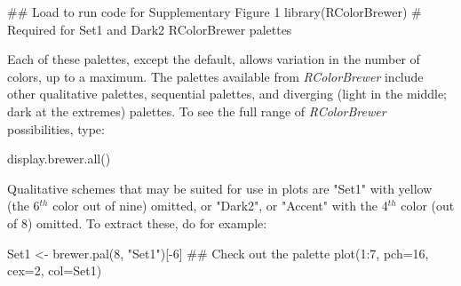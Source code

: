 \documentclass{tufte-book}\usepackage[]{graphicx}\usepackage[]{color}
\begin{document}
\begin{fullwidth}
\begin{Schunk}
\begin{Sinput}
## Load to run code for Supplementary Figure 1
library(RColorBrewer)   # Required for Set1 and Dark2 RColorBrewer palettes
\end{Sinput}
\end{Schunk}

\begin{Schunk}
\begin{Sinput}
colpal <- rev(list(
    "Default palette" = palette()[1:8],  cm.colors = cm.colors(12),
    terrain.colors = terrain.colors(12), heat.colors = heat.colors(12),
    blueRamp = colorRampPalette(c(blues9, "white"))(12),
    "Brewer-Set1" = brewer.pal(8, "Set1"),
    "Brewer-Dark2" = brewer.pal(8, "Dark2")))
palnam <- names(colpal)
plot(1, 1, xlim=c(0.5,12.5), ylim=c(0,length(palnam)+0.5), type="n",
     axes=FALSE, xlab="", ylab="")
for(i in 1:length(palnam)){
    len <- length(colpal[[i]])
    points(1:len, rep(i,len), pch=15, col=colpal[[i]], cex=5.5)
    legend(1, i+0.025, palnam[i], adj=0, box.col="white", bg="white",
           x.intersp=0, y.intersp=0, yjust=0)
\end{Sinput}
\end{Schunk}
\end{fullwidth}
Each of these palettes, except the default, allows variation in the
number of colors, up to a maximum.  The palettes available from {\em
  RColorBrewer} include other qualitative palettes, sequential
palettes, and diverging (light in the middle; dark at the extremes)
palettes.  To see the full range of {\em RColorBrewer} possibilities,
type: 
\begin{Schunk}
\begin{Sinput}
display.brewer.all()
\end{Sinput}
\end{Schunk}
\noindent
{}  Qualitative schemes that may be
suited for use in plots are "Set1" with yellow (the 6$^{th}$ color out
of nine) omitted, or "Dark2", or "Accent" with the 4$^{th}$ color
(out of 8) omitted.  To extract these, do for example:
\begin{Schunk}
\begin{Sinput}
Set1 <- brewer.pal(8, "Set1")[-6]
## Check out the palette
plot(1:7, pch=16, cex=2, col=Set1)
\end{Sinput}
\end{Schunk}
\end{document}
